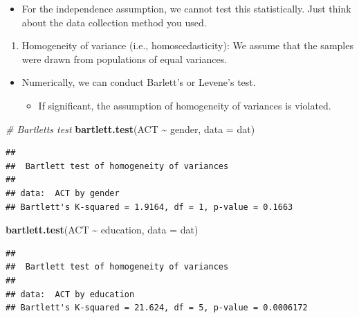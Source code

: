 \documentclass[
]{book}
\newenvironment{Shaded}{\begin{snugshade}}{\end{snugshade}}
\newcommand{\AttributeTok}[1]{\textcolor[rgb]{0.13,0.29,0.53}{#1}}
\newcommand{\CommentTok}[1]{\textcolor[rgb]{0.56,0.35,0.01}{\textit{#1}}}
\newcommand{\FunctionTok}[1]{\textcolor[rgb]{0.13,0.29,0.53}{\textbf{#1}}}
\newcommand{\NormalTok}[1]{#1}
\newcommand{\SpecialCharTok}[1]{\textcolor[rgb]{0.81,0.36,0.00}{\textbf{#1}}}
\providecommand{\tightlist}{%
  \setlength{\itemsep}{0pt}\setlength{\parskip}{0pt}}
\begin{document}
\begin{itemize}
\tightlist
\item
  For the independence assumption, we cannot test this statistically. Just think about the data collection method you used.
\end{itemize}

\begin{enumerate}
\def\labelenumi{\arabic{enumi}.}
\setcounter{enumi}{3}
\tightlist
\item
  Homogeneity of variance (i.e., homoscedasticity): We assume that the samples were drawn from populations of equal variances.
\end{enumerate}

\begin{itemize}
\item
  Numerically, we can conduct Barlett's or Levene's test.

  \begin{itemize}
  \tightlist
  \item
    If significant, the assumption of homogeneity of variances is violated.
  \end{itemize}
\end{itemize}

\begin{Shaded}
\begin{Highlighting}[]
\CommentTok{\# Bartlett\textquotesingle{}s test}
\FunctionTok{bartlett.test}\NormalTok{(ACT }\SpecialCharTok{\textasciitilde{}}\NormalTok{ gender, }\AttributeTok{data =}\NormalTok{ dat)}
\end{Highlighting}
\end{Shaded}

\begin{verbatim}
## 
##  Bartlett test of homogeneity of variances
## 
## data:  ACT by gender
## Bartlett's K-squared = 1.9164, df = 1, p-value = 0.1663
\end{verbatim}

\begin{Shaded}
\begin{Highlighting}[]
\FunctionTok{bartlett.test}\NormalTok{(ACT }\SpecialCharTok{\textasciitilde{}}\NormalTok{ education, }\AttributeTok{data =}\NormalTok{ dat)}
\end{Highlighting}
\end{Shaded}

\begin{verbatim}
## 
##  Bartlett test of homogeneity of variances
## 
## data:  ACT by education
## Bartlett's K-squared = 21.624, df = 5, p-value = 0.0006172
\end{verbatim}
\end{document}
